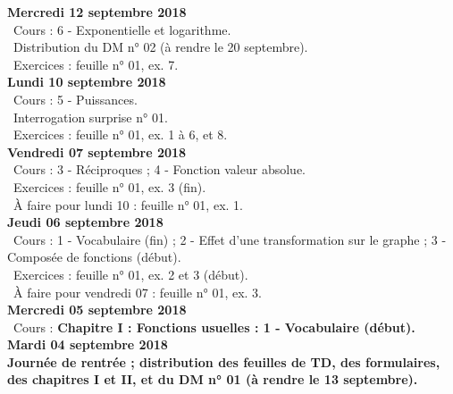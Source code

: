 \documentclass[12pt,a4paper]{article}
\begin{document}
\noindent\textbf{\bf Mercredi 12 septembre 2018}\\
\bu\ Cours : 6 - Exponentielle et logarithme.\\
\bu\ Distribution du DM n° 02 (à rendre le 20 septembre).\\
\bu\ Exercices : feuille n° 01, ex. 7.\vspace{.4cm}\\

\noindent\textbf{\bf Lundi 10 septembre 2018}\\
\bu\ Cours : 5 - Puissances.\\
\bu\ Interrogation surprise n° 01.\\
\bu\ Exercices : feuille n° 01, ex. 1 à 6, et 8.\vspace{.4cm}\\

\noindent\textbf{Vendredi 07 septembre 2018}\\
\bu\ Cours : 3 - Réciproques ; 4 - Fonction valeur absolue.\\
\bu\ Exercices : feuille n° 01, ex. 3 (fin).\\
\bu\ À faire pour lundi 10 : feuille n° 01, ex. 1.\vspace{.4cm}\\

\noindent\textbf{\bf Jeudi 06 septembre 2018}\\
\bu\ Cours : 1 - Vocabulaire (fin) ; 2 - Effet d'une transformation sur le graphe ; 3 - Composée de fonctions (début).\\
\bu\ Exercices : feuille n° 01, ex. 2 et 3 (début).\\
\bu\ À faire pour vendredi 07 : feuille n° 01, ex. 3.\vspace{.4cm}\\
    
\noindent\textbf{\bf Mercredi 05 septembre 2018}\\
\bu\ Cours : \bf Chapitre I \rm : Fonctions usuelles : 1 - Vocabulaire (début).\vspace{.4cm}\\
 
\noindent\textbf{\bf Mardi 04 septembre 2018}\\
Journée de rentrée ; distribution des feuilles de TD, des formulaires, des
chapitres I et II, et du DM n° 01 (à rendre le 13 septembre).\vspace{.4cm}\\


\label{end}
\end{document}
